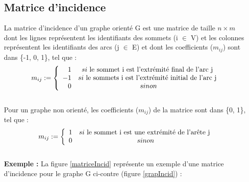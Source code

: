 			\subsection{Matrice d'incidence}
			La matrice d'incidence d'un graphe orienté  G est une matrice de taille $n \times m$  dont les lignes représentent les identifiants des sommets (i $\in$ V) et les colonnes représentent les identifiants des arcs (j $\in$ E) et dont les coefficients (${m}_{ij}$) sont dans \{-1, 0, 1\}, tel que \citep{hennecart2012elements} \citep{mathieu} :
			\[{m}_{ij} :=
			\left\{
			\begin{array}{r c l}
			1 & si $ le sommet i est l'extrémité final de 					l'arc j $ \\
			
			-1 & si $ le sommets i est l'extrémité initial de 				l'arc j $ \\
			0 & sinon \\
			\end{array}
			\right.
			\]
			\\
Pour un graphe non orienté, les coefficients (${m}_{ij}$) de la matrice sont dans \{0, 1\}, tel que \citep{hennecart2012elements} :
			\[{m}_{ij} :=
			\left\{
			\begin{array}{r c l}
			1 & si $ le sommet i est une extrémité					de l'arête j $ \\
			0 & sinon \\
			\end{array}
			\right.
			\]
			\\
\textbf{Exemple :} La figure \ref{matriceIncid} représente 					un exemple d'une matrice d'incidence pour le graphe G ci-contre 			(figure \ref{grapIncid}) :
			
